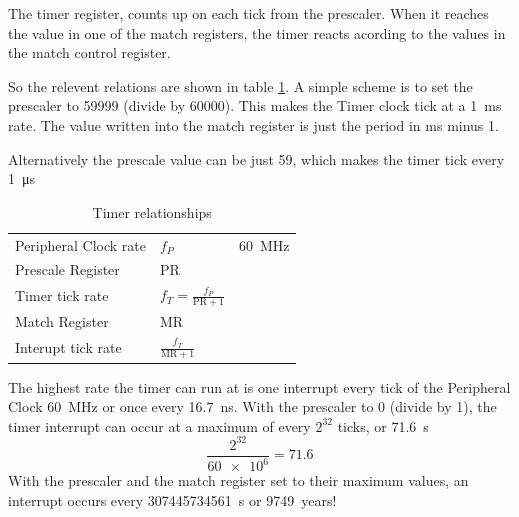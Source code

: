 \documentclass[a4paper]{tufte-handout}
\begin{document}
The timer register, counts up on each tick from the prescaler.
When it reaches the value in one of the match registers, the timer
reacts acording to the values in the match control register.

So the relevent relations are shown in table \ref{tab:timer}.
A simple scheme is to set the prescaler to 59999 (divide by 60000).
This makes the Timer clock tick at a \SI{1}{\milli\second} rate.  
The value written into the match register is just the period in 
\si{\milli\second} minus 1.

Alternatively the prescale value can be just 59, which makes the timer
tick every \SI{1}{\micro\second}

\begin{table}
  \begin{tabular}{lll}
    Peripheral Clock rate & $f_P$ & \SI{60}{\mega\hertz} \\
    Prescale Register & $\mathrm{PR}$ & \\
    Timer tick rate & $f_T = \frac{f_P}{\mathrm{PR}+1}$ & \\
    Match Register & $\mathrm{MR}$ & \\
    Interupt tick rate & $\frac{f_T}{\mathrm{MR}+1}$ & \\
  \end{tabular}
  \caption{Timer relationships}
  \label{tab:timer}
\end{table}

\label{sec:timer-behavior-end}
The highest rate the timer can run at is one interrupt every tick of
the Peripheral Clock \SI{60}{\mega\hertz} or once every
\SI{16.7}{\nano\second}.  With the prescaler to 0 (divide by 1), the
timer interrupt can occur at a maximum of every $2^{32}$ ticks, or \SI{71.6}{\second}
\[
\frac{2^{32}}{\num{60e6}} = 71.6
\] 
With the prescaler and the match register set to their maximum values,
an interrupt occurs every \SI{307445734561}{\second} or
\num{9749}~years!
\end{document}
